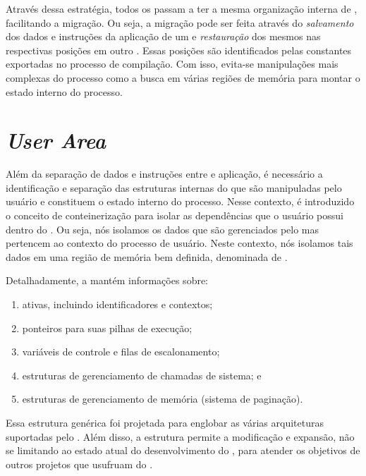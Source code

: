    Através dessa estratégia, todos os \clusters passam a ter a mesma organização interna de , facilitando a migração. Ou seja, a migração pode ser feita através do \textit{salvamento} dos dados e instruções da aplicação de um \cluster e \textit{restauração} dos mesmos nas respectivas posições em outro \cluster. Essas posições são identificados pelas constantes exportadas no processo de compilação. Com isso, evita-se manipulações mais complexas do processo como a busca em várias regiões de memória para montar o estado interno do processo.

    
\section{\textit{User Area}}
\label{sec.uarea}

    Além da separação de dados e instruções entre  e aplicação, é necessário a identificação e separação das estruturas internas do \so que são manipuladas pelo usuário e constituem o estado interno do processo. Nesse contexto, é introduzido o conceito de conteinerização para isolar as dependências que o usuário possui dentro do \cluster. Ou seja, nós isolamos os dados que são gerenciados pelo  mas pertencem ao contexto do processo de usuário. Neste contexto, nós isolamos tais dados em uma região de memória bem definida, denominada de \uarea. 

    Detalhadamente, a \uarea mantém informações sobre:
    \begin{enumerate}[label=(\roman*)]
        \item \threads ativas, incluindo identificadores e contextos;
        \item ponteiros para suas pilhas de execução; 
        \item variáveis de controle e filas de escalonamento;
        \item estruturas de gerenciamento de chamadas de sistema; e
        \item estruturas de gerenciamento de memória (\eg sistema de paginação).
    \end{enumerate}

    Essa estrutura genérica foi projetada para englobar as várias arquiteturas suportadas pelo \nanvix. Além disso, a estrutura permite a modificação e expansão, não se limitando ao estado atual do desenvolvimento do \nanvix, para atender os objetivos de outros projetos que usufruam do \nanvix.


